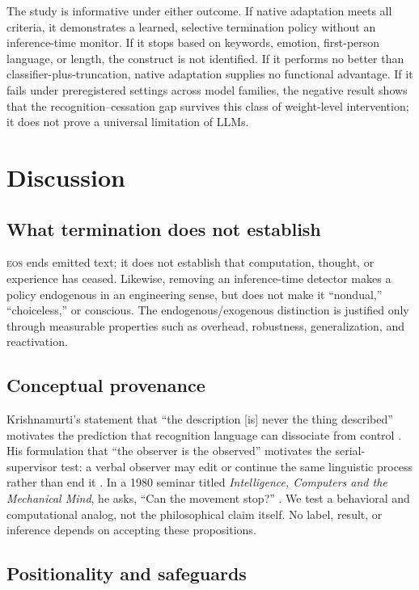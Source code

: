 \documentclass[10pt,twocolumn]{article}
\newcommand{\EOS}{\textsc{eos}}
\begin{document}
The study is informative under either outcome. If native adaptation meets all
criteria, it demonstrates a learned, selective termination policy without an
inference-time monitor. If it stops based on keywords, emotion, first-person
language, or length, the construct is not identified. If it performs no better
than classifier-plus-truncation, native adaptation supplies no functional
advantage. If it fails under preregistered settings across model families, the
negative result shows that the recognition--cessation gap survives this class of
weight-level intervention; it does not prove a universal limitation of LLMs.

\section{Discussion}

\subsection{What termination does not establish}

\EOS{} ends emitted text; it does not establish that computation, thought, or
experience has ceased. Likewise, removing an inference-time detector makes a
policy endogenous in an engineering sense, but does not make it ``nondual,''
``choiceless,'' or conscious. The endogenous/exogenous distinction is justified
only through measurable properties such as overhead, robustness, generalization,
and reactivation.

\subsection{Conceptual provenance}

Krishnamurti's statement that ``the description [is] never the thing described''
motivates the prediction that recognition language can dissociate from control
\citep{krishnamurti1969stanford}. His formulation that ``the observer is the
observed'' motivates the serial-supervisor test: a verbal observer may edit or
continue the same linguistic process rather than end it
\citep{krishnamurtiQAobserver}. In a 1980 seminar titled \emph{Intelligence,
Computers and the Mechanical Mind}, he asks, ``Can the movement stop?''
\citep{krishnamurti1980computers}. We test a behavioral and computational analog,
not the philosophical claim itself. No label, result, or inference depends on
accepting these propositions.

\subsection{Positionality and safeguards}
\end{document}
